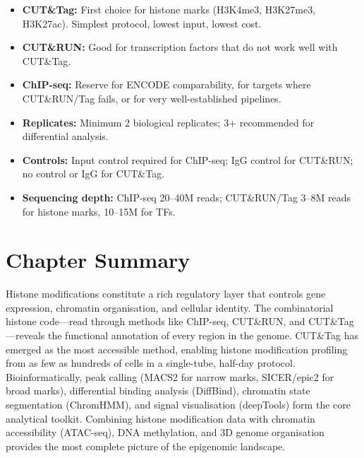 \begin{keyconcept}[title={Choosing Between ChIP-seq, CUT\&RUN, and CUT\&Tag}]
\begin{itemize}[itemsep=2pt]
  \item \textbf{CUT\&Tag:} First choice for histone marks (H3K4me3, H3K27me3, H3K27ac). Simplest protocol, lowest input, lowest cost.
  \item \textbf{CUT\&RUN:} Good for transcription factors that do not work well with CUT\&Tag.
  \item \textbf{ChIP-seq:} Reserve for ENCODE comparability, for targets where CUT\&RUN/Tag fails, or for very well-established pipelines.
  \item \textbf{Replicates:} Minimum 2 biological replicates; 3+ recommended for differential analysis.
  \item \textbf{Controls:} Input control required for ChIP-seq; IgG control for CUT\&RUN; no control or IgG for CUT\&Tag.
  \item \textbf{Sequencing depth:} ChIP-seq 20--40M reads; CUT\&RUN/Tag 3--8M reads for histone marks, 10--15M for TFs.
\end{itemize}
\end{keyconcept}

\section{Chapter Summary}
\label{sec:histones:summary}

Histone modifications constitute a rich regulatory layer that controls gene expression, chromatin organisation, and cellular identity. The combinatorial histone code---read through methods like ChIP-seq, CUT\&RUN, and CUT\&Tag---reveals the functional annotation of every region in the genome. CUT\&Tag has emerged as the most accessible method, enabling histone modification profiling from as few as hundreds of cells in a single-tube, half-day protocol. Bioinformatically, peak calling (MACS2 for narrow marks, SICER/epic2 for broad marks), differential binding analysis (DiffBind), chromatin state segmentation (ChromHMM), and signal visualisation (deepTools) form the core analytical toolkit. Combining histone modification data with chromatin accessibility (ATAC-seq), DNA methylation, and 3D genome organisation provides the most complete picture of the epigenomic landscape.
